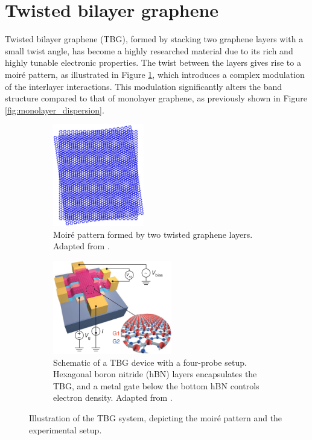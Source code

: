 \section{Twisted bilayer graphene} \label{sec:experimental_tbg}

Twisted bilayer graphene (TBG), formed by stacking two graphene layers with a small twist angle, has become a highly researched material due to its rich and highly tunable electronic properties. The twist between the layers gives rise to a moiré pattern, as illustrated in Figure \ref{fig:moire_pattern}, which introduces a complex modulation of the interlayer interactions. This modulation significantly alters the band structure compared to that of monolayer graphene, as previously shown in Figure \ref{fig:monolayer_dispersion}.

\begin{figure}[H]
\centering
\begin{subfigure}{.37\textwidth}
  \centering
  \includegraphics[height=12em]{fig/moire_pattern.png}
  \caption{Moiré pattern formed by two twisted graphene layers. Adapted from \cite{moire_pattern_figure2021}.}
  \label{fig:moire_pattern}
\end{subfigure} \hfill
\begin{subfigure}{.60\textwidth}
  \centering
  \includegraphics[height=11em]{fig/tbg_device2.png}
  \caption{Schematic of a TBG device with a four-probe setup. Hexagonal boron nitride (hBN) layers encapsulates the TBG, and a metal gate below the bottom hBN controls electron density. Adapted from \cite{cao2018}.}
  \label{fig:tbg_device2}
\end{subfigure}
\caption{Illustration of the TBG system, depicting the moiré pattern and the experimental setup.}
\label{fig:tbg_moire_device}
\end{figure}

